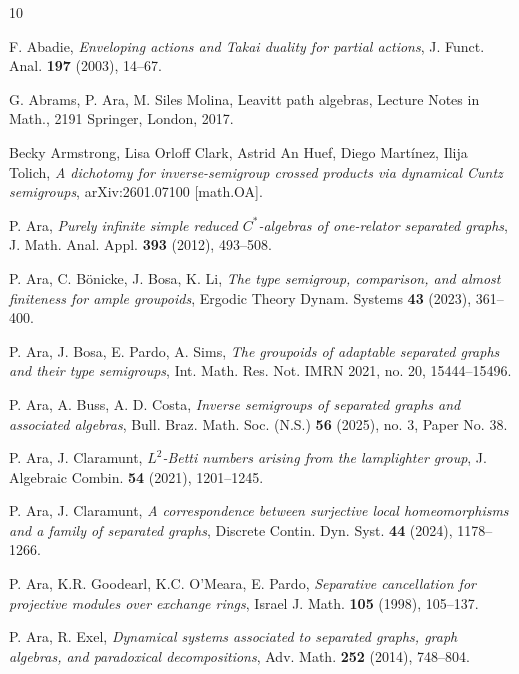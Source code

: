\documentclass[11pt]{amsart}
\theoremstyle{plain}            %
\theoremstyle{definition}       %
\theoremstyle{definition}       %
\theoremstyle{remark}
\begin{document}
\providecommand{\bysame}{\leavevmode\hbox
	to3em{\hrulefill}\thinspace}
\begin{thebibliography}{10}
	
	F. Abadie,
	\emph{Enveloping actions and Takai duality for partial actions},
	J. Funct. Anal. {\bf 197} (2003), 14--67.
	
	G. Abrams, P. Ara, M. Siles Molina, 
	Leavitt path algebras, Lecture Notes in Math., 2191
	Springer, London, 2017.

     Becky Armstrong, Lisa Orloff Clark, Astrid An Huef, Diego Martínez, Ilija Tolich,
     \emph{A dichotomy for inverse-semigroup crossed products via dynamical Cuntz semigroups}, 
      	arXiv:2601.07100 [math.OA].
          
	 P. Ara, \emph{Purely infinite simple reduced  $C^*$-algebras of one-relator separated graphs}, J. Math. Anal. Appl. \textbf{393} (2012), 493--508.
	
	 P. Ara, C. Bönicke, J. Bosa, K. Li, 
	\emph{The type semigroup, comparison, and almost finiteness for ample groupoids},
	Ergodic Theory Dynam. Systems \textbf{43} (2023), 361--400.	
	
	  P. Ara, J. Bosa, E. Pardo, A. Sims, 
	\emph{The groupoids of adaptable separated graphs and their type semigroups},
	Int. Math. Res. Not. IMRN 2021, no. 20, 15444–15496.
	
	 P. Ara, A. Buss, A. D. Costa, 
	\emph{Inverse semigroups of separated graphs and associated algebras},
	Bull. Braz. Math. Soc. (N.S.) \textbf{56} (2025), no. 3, Paper No. 38.
	
	 P. Ara, J. Claramunt, 
	\emph{$L^2$-Betti numbers arising from the lamplighter group},
	J. Algebraic Combin. \textbf{54} (2021), 1201--1245.
	
     P. Ara, J. Claramunt, \emph{A correspondence between surjective local homeomorphisms and a family of separated graphs}, Discrete Contin. Dyn. Syst. \textbf{44} (2024), 1178--1266.

     P. Ara, K.R. Goodearl, K.C. O'Meara, E. Pardo, \emph{Separative cancellation for projective modules over exchange rings}, Israel J. Math. \textbf{105} (1998), 105--137.

	 P. Ara, R. Exel, \emph{Dynamical systems associated to separated graphs, graph algebras, and paradoxical decompositions}, Adv. Math. \textbf{252} (2014), 748--804.
	

\end{thebibliography}
\end{document}
